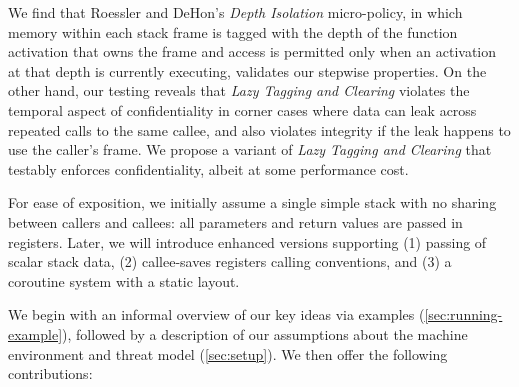 \documentclass[10pt,conference]{ieeetran}%
\theoremstyle{definition}
\begin{document}
We find that Roessler and DeHon's {\em Depth Isolation} micro-policy, in
which memory within each stack frame is tagged with the depth of
the function activation that owns the frame and access is
permitted only when an activation at that depth is currently executing, validates our
stepwise properties. On the other hand, our testing reveals that \emph{Lazy Tagging and Clearing}
violates the temporal aspect of confidentiality in
corner cases where data can leak across repeated calls to the same callee,
and also violates integrity if the leak happens to use the caller's frame. We
propose a variant of {\em Lazy Tagging and Clearing} that testably enforces
confidentiality, albeit at some performance cost.
%
\ifaftersubmission
{}
\fi

For ease of exposition, we initially assume a single simple
stack with no sharing between callers and callees: all parameters and return
values are passed in registers.  Later, we will introduce enhanced versions
supporting
(1) passing of scalar stack data,
(2) callee-saves registers calling conventions, and
(3) a coroutine system with a static layout.

We begin with an informal overview of our key ideas via
examples (\cref{sec:running-example}), followed by a description of our
assumptions about the machine environment and threat model (\cref{sec:setup}).
We then offer the following contributions:
\end{document}
